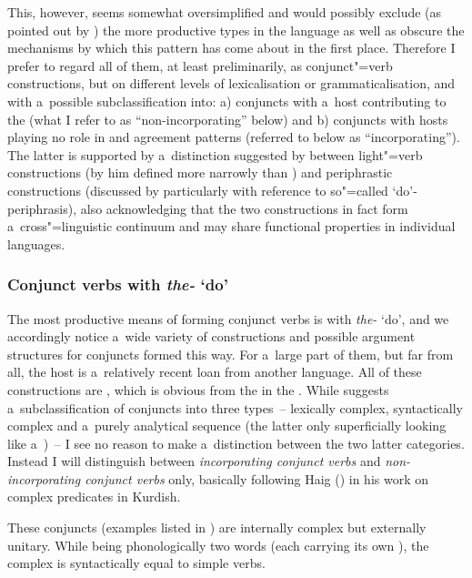 This, however, seems somewhat oversimplified and would possibly exclude (as pointed out by \citealt[160]{masica1993}) the more productive types in the language as well as obscure the mechanisms by which this pattern has come about in the first place. Therefore I prefer to regard all of them, at least preliminarily, as conjunct"=verb constructions, but on different levels of lexicalisation or grammaticalisation, and with a~possible subclassification into: a) conjuncts with a~host contributing to the  (what I refer to as ``non-incorporating'' below) and b) conjuncts with hosts playing no role in  and agreement patterns (referred to below as ``incorporating''). The latter is supported by a~distinction suggested by \citet[69--74]{jaeger2006} between light"=verb constructions (by him defined more narrowly than \citealt{butt2010}) and periphrastic constructions (discussed by \citeauthor{jaeger2006} particularly with reference to so"=called `do'-periphrasis), also acknowledging that the two constructions in fact form a~cross"=linguistic continuum and may share functional properties in individual languages. 



\subsubsection*{Conjunct verbs with \textit{the-} `do'}

The most productive means of forming conjunct verbs is with \textit{the-} `do', and we accordingly notice a~wide variety of constructions and possible argument structures for conjuncts formed this way. For a~large part of them, but far from all, the host is a~relatively recent loan from another language. All of these constructions are , which is obvious from the  in the . While \citet[201]{verma1993} suggests a~subclassification of conjuncts into three types~-- lexically complex, syntactically complex and a~purely analytical sequence (the latter only superficially looking like a~)~-- I see no reason to make a~distinction between the two latter categories. Instead I will distinguish between \textit{incorporating conjunct verbs} and \textit{non-incorporating conjunct verbs} only, basically following Haig (\citeyear{haig2002}) in his work on complex predicates in Kurdish.


 These conjuncts (examples listed in ) are internally complex but externally unitary. While being phonologically two words (each carrying its own ), the complex is syntactically equal to simple  verbs.


